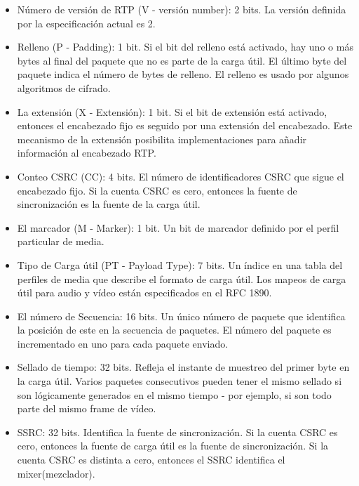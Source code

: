 \begin{itemize}
\item Número de versión de RTP (V - versión number): 2 bits. La versión definida por la especificación actual es 2.

\item Relleno (P - Padding): 1 bit. Si el bit del relleno está activado, hay uno o más bytes al final del paquete que no es parte de la carga útil. El último byte del paquete indica el número de bytes de relleno. El relleno es usado por algunos algoritmos de cifrado.

\item La extensión (X - Extensión): 1 bit. Si el bit de extensión está activado, entonces el encabezado fijo es seguido por una extensión del encabezado. Este mecanismo de la extensión posibilita implementaciones para añadir información al encabezado RTP.

\item Conteo CSRC (CC): 4 bits. El número de identificadores CSRC que sigue el encabezado fijo. Si la cuenta CSRC es cero, entonces la fuente de sincronización es la fuente de la carga útil.

\item El marcador (M - Marker): 1 bit. Un bit de marcador definido por el perfil particular de media.

\item Tipo de Carga útil (PT - Payload Type): 7 bits. Un índice en una tabla del perfiles de media que describe el formato de carga útil. Los mapeos de carga útil para audio y vídeo están especificados en el RFC 1890.


\item El número de Secuencia: 16 bits. Un único número de paquete que identifica la posición de este en la secuencia de paquetes. El número del paquete es incrementado en uno para cada paquete enviado.

\item 
Sellado de tiempo: 32 bits. Refleja el instante de muestreo del primer byte en la carga útil. Varios paquetes consecutivos pueden tener el mismo sellado si son lógicamente generados en el mismo tiempo - por ejemplo, si son todo parte del mismo frame de vídeo.
\item 
SSRC: 32 bits. Identifica la fuente de sincronización. Si la cuenta CSRC es cero, entonces la fuente de carga útil es la fuente de sincronización. Si la cuenta CSRC es distinta a cero, entonces el SSRC identifica el mixer(mezclador).


\end{itemize}
